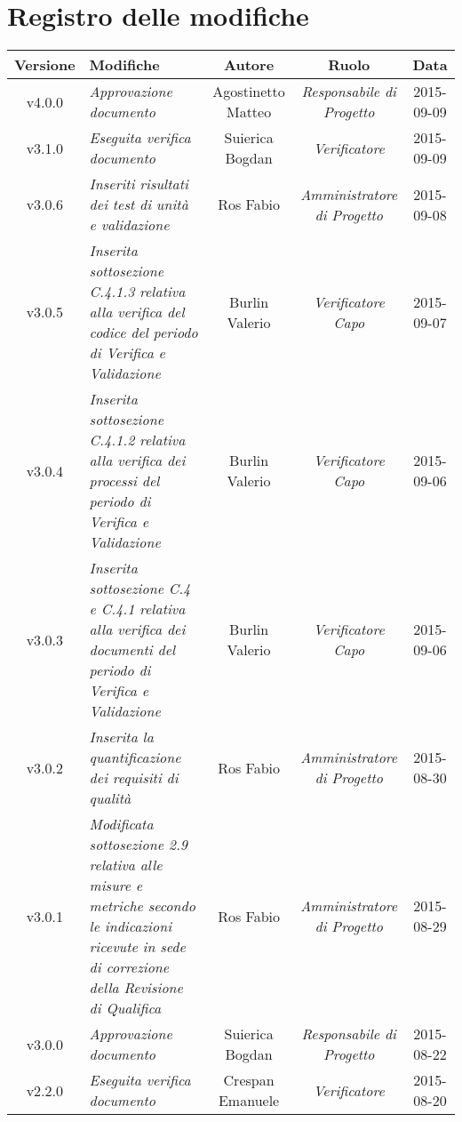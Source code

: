 \newpage
\section*{Registro delle modifiche}

\begin{table}[h]
\centering
\begin{tabular}{|c|p{}|c|c|c|}
	\toprule
		\textbf{Versione} & \textbf{Modifiche} & \textbf{Autore} & \textbf{Ruolo} & \textbf{Data} \\
	\midrule
	\midrule
		v4.0.0 & \textit{Approvazione documento} & Agostinetto Matteo & \textit{Responsabile di Progetto} & 2015-09-09\\
	\midrule
		v3.1.0 & \textit{Eseguita verifica documento} & Suierica Bogdan & \textit{Verificatore} & 2015-09-09\\
	\midrule
		v3.0.6 & \textit{Inseriti risultati dei test di unità e validazione} & Ros Fabio & \textit{Amministratore di Progetto} & 2015-09-08\\
	\midrule
		v3.0.5 & \textit{Inserita sottosezione C.4.1.3 relativa alla verifica del codice del periodo di Verifica e Validazione} & Burlin Valerio & \textit{Verificatore Capo} & 2015-09-07\\
	\midrule
		v3.0.4 & \textit{Inserita sottosezione C.4.1.2 relativa alla verifica dei processi del periodo di Verifica e Validazione} & Burlin Valerio & \textit{Verificatore Capo} & 2015-09-06\\
	\midrule
		v3.0.3 & \textit{Inserita sottosezione C.4 e C.4.1 relativa alla verifica dei documenti del periodo di Verifica e Validazione} & Burlin Valerio & \textit{Verificatore Capo} & 2015-09-06\\
	\midrule
		v3.0.2 & \textit{Inserita la quantificazione dei requisiti di qualità} & Ros Fabio & \textit{Amministratore di Progetto} & 2015-08-30\\
	\midrule
		v3.0.1 & \textit{Modificata sottosezione 2.9 relativa alle misure e metriche secondo le indicazioni ricevute in sede di correzione della Revisione di Qualifica} & Ros Fabio & \textit{Amministratore di Progetto} & 2015-08-29\\
	\midrule
		v3.0.0 & \textit{Approvazione documento} & Suierica Bogdan & \textit{Responsabile di Progetto} & 2015-08-22\\
	\midrule
		v2.2.0 & \textit{Eseguita verifica documento} & Crespan Emanuele & \textit{Verificatore} & 2015-08-20\\
	\bottomrule
\end{tabular}
\end{table}

